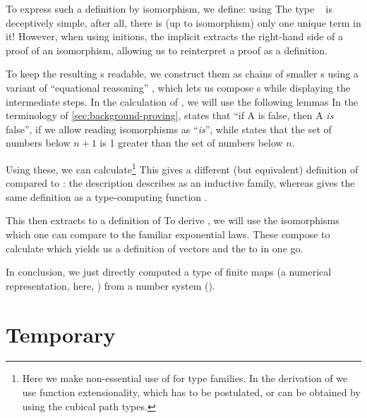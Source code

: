 To express such a definition by isomorphism, we define:
using
The type \  is deceptively simple, after all, there is (up to isomorphism) only one unique term in it! However, when using initions, the implicit  extracts the right-hand side of a proof of an isomorphism, allowing us to reinterpret a proof as a definition.

To keep the resulting s readable, we construct them as chains of smaller s using a variant of ``equational reasoning'' \cite{agdastdlib, plfa}, which lets us compose s while displaying the intermediate steps. In the calculation of , we will use the following lemmas
In the terminology of \autoref{sec:background-proving},  states that ``if A is false, then A \emph{is} false'', if we allow reading isomorphisms as ``\emph{is}'', while  states that the set of numbers below $n+1$ is 1 greater than the set of numbers below $n$.

Using these, we can calculate\footnote{Here we make non-essential use of  for type families. In the derivation of  we use function extensionality, which has to be postulated, or can be obtained by using the cubical path types.}
This gives a different (but equivalent) definition of  compared to : the description  describes  as an inductive family, whereas  gives the same definition as a type-computing function \cite{progorn}.

This  then extracts to a definition of 
To derive , we will use the isomorphisms
which one can compare to the familiar exponential laws. These compose to calculate
which yields us a definition of vectors
and the  to  in one go.

In conclusion, we just directly computed a type of finite maps (a numerical representation, here, ) from a number system (\bN{}).


\section{Temporary}

